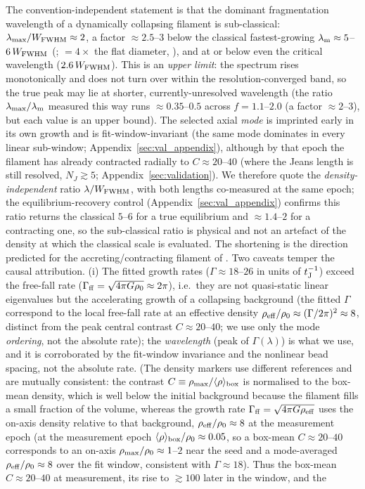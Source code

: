 \documentclass[usenatbib,twoside,twocolumn]{mnras}
\begin{document}
The convention-independent statement is that the dominant fragmentation wavelength of a dynamically collapsing filament is sub-classical: $\lambda_{\rm max}/W_{\rm FWHM}\approx2$, a factor $\approx2.5$--$3$ below the classical fastest-growing $\lambda_{\rm m}\approx5$--$6\,W_{\rm FWHM}$ (\citealt{Fischera2012}; $=4\times$ the flat diameter, \citealt{Inutsuka1992}), and at or below even the critical wavelength ($2.6\,W_{\rm FWHM}$). This is an \emph{upper limit}: the spectrum rises monotonically and does not turn over within the resolution-converged band, so the true peak may lie at shorter, currently-unresolved wavelength (the ratio $\lambda_{\rm max}/\lambda_{\rm m}$ measured this way runs $\approx0.35$--$0.5$ across $f=1.1$--$2.0$ (a factor $\approx2$--$3$), but each value is an upper bound). The selected axial \emph{mode} is imprinted early in its own growth and is fit-window-invariant (the same mode dominates in every linear sub-window; Appendix~\ref{sec:val_appendix}), although by that epoch the filament has already contracted radially to $C\approx20$--$40$ (where the Jeans length is still resolved, $N_J\gtrsim5$; Appendix~\ref{sec:validation}). We therefore quote the \emph{density-independent} ratio $\lambda/W_{\rm FWHM}$, with both lengths co-measured at the same epoch; the equilibrium-recovery control (Appendix~\ref{sec:val_appendix}) confirms this ratio returns the classical $5$--$6$ for a true equilibrium and $\approx1.4$--$2$ for a contracting one, so the sub-classical ratio is physical and not an artefact of the density at which the classical scale is evaluated. The shortening is the direction predicted for the accreting/contracting filament of \citet{Clarke2016,Clarke2017}. Two caveats temper the causal attribution. (i) The fitted growth rates ($\Gamma\approx18$--$26$ in units of $t_{\rm J}^{-1}$) exceed the free-fall rate ($\Gamma_{\rm ff}=\sqrt{4\pi G\rho_0}\approx2\pi$), i.e.\ they are not quasi-static linear eigenvalues but the accelerating growth of a collapsing background (the fitted $\Gamma$ correspond to the local free-fall rate at an effective density $\rho_{\rm eff}/\rho_0\approx(\Gamma/2\pi)^2\approx8$, distinct from the peak central contrast $C\approx20$--$40$; we use only the mode \emph{ordering}, not the absolute rate); the \emph{wavelength} (peak of $\Gamma(\lambda)$) is what we use, and it is corroborated by the fit-window invariance and the nonlinear bead spacing, not the absolute rate. (The density markers use different references and are mutually consistent: the contrast $C\equiv\rho_{\rm max}/\langle\rho\rangle_{\rm box}$ is normalised to the box-mean density, which is well below the initial background because the filament fills a small fraction of the volume, whereas the growth rate $\Gamma_{\rm ff}=\sqrt{4\pi G\rho_{\rm eff}}$ uses the on-axis density relative to that background, $\rho_{\rm eff}/\rho_0\approx8$ at the measurement epoch (at the measurement epoch $\langle\rho\rangle_{\rm box}/\rho_0\approx0.05$, so a box-mean $C\approx20$--$40$ corresponds to an on-axis $\rho_{\rm max}/\rho_0\approx1$--$2$ near the seed and a mode-averaged $\rho_{\rm eff}/\rho_0\approx8$ over the fit window, consistent with $\Gamma\approx18$). Thus the box-mean $C\approx20$--$40$ at measurement, its rise to $\gtrsim100$ later in the window, and the 
\end{document}
